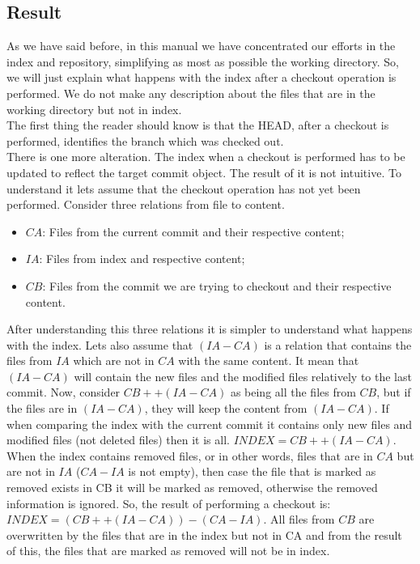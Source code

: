 \subsection{Result}
As we have said before, in this manual we have
concentrated our efforts in the index and repository, simplifying as
most as possible the working directory. So, we will just explain what
happens with the index after a checkout operation is performed. We do
not make any description about the files that are in the working directory
but not in index.\\

The first thing the reader should know is that the
HEAD, after a checkout is performed, identifies the branch which was
checked out.\\

There is one more alteration. The index when a checkout is performed
has to be updated to reflect the target commit object. The result of it is not intuitive. To
understand it lets assume that the checkout operation has not yet been 
performed. Consider three relations from file to content. 
\begin{itemize}
   \item $CA$: Files from the current commit and their
   respective content;
   \item $IA$: Files from index and respective content;
   \item $CB$: Files from the commit we are trying to checkout
   and their respective content.
\end{itemize}
After understanding this three relations it is simpler to understand
what happens with the index. Lets also assume that $(IA-CA)$ is a relation that
contains the files from $IA$ which are not in $CA$ with the same content.
It mean that $(IA-CA)$ will contain the new files and the modified files relatively to
the last commit. Now, consider $CB ++ (IA-CA)$ as being all the files
from $CB$, but if the files are in $(IA-CA)$, they will keep the
content from $(IA-CA)$. If when comparing the index with the current
commit it contains only new files and modified files (not deleted
files) then it is all. $INDEX = CB ++ (IA-CA)$. When the index
contains removed files, or in other words, files that are in $CA$ but are not in
$IA$ ($CA-IA$ is not empty), then case the file that is marked as removed exists
in CB it will be marked as removed, otherwise the removed information is
ignored. So, the result of performing a checkout is: $INDEX = (CB ++
(IA-CA)) - (CA-IA)$. All files from $CB$ are overwritten by the files
that are in the index but not in CA and from the result of this, the
files that are marked as removed will not be in index.

